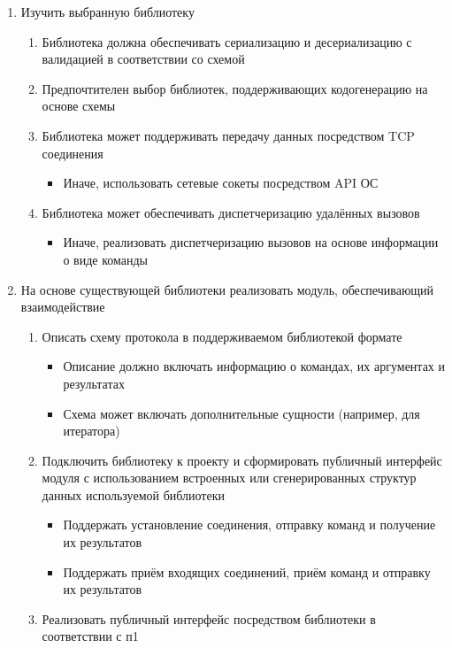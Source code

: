 \documentclass[12pt,onecolumn]{article}
\begin{document}
\begin{enumerate}
  \item  {
    Изучить выбранную библиотеку
    \begin{enumerate}
      \item Библиотека должна обеспечивать сериализацию и десериализацию с валидацией в соответствии со схемой
      \item Предпочтителен выбор библиотек, поддерживающих кодогенерацию на основе схемы
      \item Библиотека может поддерживать передачу данных посредством TCP соединения
      \begin{itemize}
        \item Иначе, использовать сетевые сокеты посредством API ОС
      \end{itemize}
      \item Библиотека может обеспечивать диспетчеризацию удалённых вызовов
      \begin{itemize}
        \item Иначе, реализовать диспетчеризацию вызовов на основе информации о виде команды
      \end{itemize}
    \end{enumerate}
  }
  \item {
    На основе существующей библиотеки реализовать модуль, обеспечивающий взаимодействие
    \begin{enumerate}
      \item Описать схему протокола в поддерживаемом библиотекой формате
      \begin{itemize}
        \item Описание должно включать информацию о командах, их аргументах и результатах
        \item Схема может включать дополнительные сущности (например, для итератора)
      \end{itemize}
      \item Подключить библиотеку к проекту и сформировать публичный интерфейс модуля с использованием встроенных или сгенерированных структур данных используемой библиотеки
      \begin{itemize}
        \item Поддержать установление соединения, отправку команд и получение их результатов
        \item Поддержать приём входящих соединений, приём команд и отправку их результатов
      \end{itemize}
      \item Реализовать публичный интерфейс посредством библиотеки в соответствии с п1
    \end{enumerate}
  }


\end{enumerate}
\end{document}
